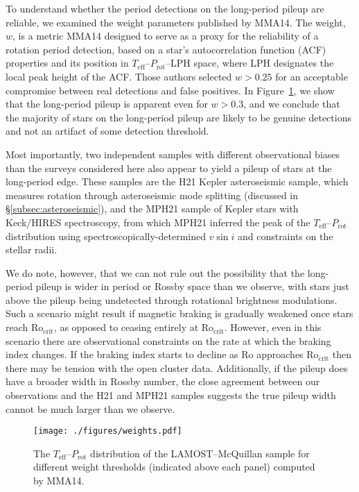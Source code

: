\documentclass[trackchanges,twocolumn]{aastex631}
\newcommand{\rocrit}{$\mathrm{Ro_{crit}}$\xspace}
\newcommand{\lamostmcq}{LAMOST--McQuillan\xspace}
\newcommand{\mma}{MMA14\xspace}
\newcommand{\hall}{H21\xspace}
\newcommand{\masuda}{MPH21\xspace}
\newcommand{\teff}{\ensuremath{T_{\mathrm{eff}}}\xspace}
\newcommand{\vsini}{\ensuremath{v \sin i}\xspace}
\newcommand{\prot}{\ensuremath{P_\mathrm{rot}}\xspace}
\begin{document}
To understand whether the period detections on the long-period pileup are reliable, we examined the weight parameters published by \mma. The weight, $w$, is a metric \mma designed to serve as a proxy for the reliability of a rotation period detection, based on a star's autocorrelation function (ACF) properties and its position in $T_\mathrm{eff}$–$P_\mathrm{rot}$–LPH space, where LPH designates the local peak height of the ACF. Those authors selected $w>0.25$ for an acceptable compromise between real detections and false positives. In Figure~\ref{fig:weights}, we show that the long-period pileup is apparent even for $w>0.3$, and we conclude that the majority of stars on the long-period pileup are likely to be genuine detections and not an artifact of some detection threshold.

Most importantly, two independent samples with different observational biases than the surveys considered here also appear to yield a pileup of stars at the long-period edge. These samples are the \hall Kepler asteroseismic sample, which measures rotation through asteroseismic mode splitting (discussed in \S\ref{subsec:asteroseismic}), and the \masuda sample of Kepler stars with Keck/HIRES spectroscopy, from which \masuda inferred the peak of the \teff–\prot distribution using spectroscopically-determined \vsini and constraints on the stellar radii.

We do note, however, that we can not rule out the possibility that the long-period pileup is wider in period or Rossby space than we observe, with stars just above the pileup being undetected through rotational brightness modulations. Such a scenario might result if magnetic braking is gradually weakened once stars reach \rocrit, as opposed to ceasing entirely at \rocrit. However, even in this scenario there are observational constraints on the rate at which the braking index changes. If the braking index starts to decline as Ro approaches \rocrit then there may be tension with the open cluster data. Additionally, if the pileup does have a broader width in Rossby number, the close agreement between our observations and the \hall and \masuda samples suggests the true pileup width cannot be much larger than we observe.

\begin{figure}
    \centering
    \texttt{[image: ./figures/weights.pdf]}
    \caption{The \teff–\prot distribution of the \lamostmcq sample for different weight thresholds (indicated above each panel) computed by \mma.}
    \label{fig:weights}
\end{figure}
\end{document}
